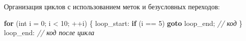 \documentclass[
]{article}
\newenvironment{Shaded}{}{}
\newcommand{\CommentTok}[1]{\textcolor[rgb]{0.38,0.63,0.69}{\textit{#1}}}
\newcommand{\ControlFlowTok}[1]{\textcolor[rgb]{0.00,0.44,0.13}{\textbf{#1}}}
\newcommand{\DataTypeTok}[1]{\textcolor[rgb]{0.56,0.13,0.00}{#1}}
\newcommand{\DecValTok}[1]{\textcolor[rgb]{0.25,0.63,0.44}{#1}}
\newcommand{\NormalTok}[1]{#1}
\newcommand{\OperatorTok}[1]{\textcolor[rgb]{0.40,0.40,0.40}{#1}}
\begin{document}
Организация циклов с использованием меток и безусловных переходов:

\begin{Shaded}
\begin{Highlighting}[]
\ControlFlowTok{for} \OperatorTok{(}\DataTypeTok{int}\NormalTok{ i }\OperatorTok{=} \DecValTok{0}\OperatorTok{;}\NormalTok{ i }\OperatorTok{\textless{}} \DecValTok{10}\OperatorTok{;} \OperatorTok{++}\NormalTok{i}\OperatorTok{)} \OperatorTok{\{}
\NormalTok{loop\_start}\OperatorTok{:}
    \ControlFlowTok{if} \OperatorTok{(}\NormalTok{i }\OperatorTok{==} \DecValTok{5}\OperatorTok{)} \ControlFlowTok{goto}\NormalTok{ loop\_end}\OperatorTok{;}
    \CommentTok{// код}
\OperatorTok{\}}
\NormalTok{loop\_end}\OperatorTok{:}
\CommentTok{// код после цикла}
\end{Highlighting}
\end{Shaded}
\end{document}
